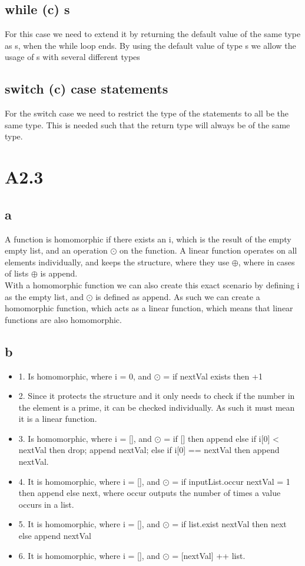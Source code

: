 \documentclass[10pt,a4paper]{article}      %
\begin{document}
\subsection*{while (c) s}
For this case we need to extend it by returning the default value of the same type as s, when the while loop ends. By using the default value of type s we allow the usage of s with several different types 



\subsection*{switch (c) {case statements}}
For the switch case we need to restrict the type of the statements to all be the same type. This is needed such that the return type will always be of the same type.

\section*{A2.3}
\subsection*{a}
A function is homomorphic if there exists an i, which is the result of the empty empty list, and an operation $\odot$ on the function. A linear function operates on all elements individually, and keeps the structure, where they use $\oplus$, where in cases of lists $\oplus$ is append. \\
With a homomorphic function we can also create this exact scenario by defining i as the empty list, and $\odot$ is defined as append. As such we can create a homomorphic function, which acts as a linear function, which means that linear functions are also homomorphic.

\subsection*{b}
\begin{itemize}
\item 1. Is homomorphic, where i = 0, and $\odot$ = if nextVal exists then +1
\item 2. Since it protects the structure and it only needs to check if the number in the element is a prime, it can be checked individually. As such it must mean it is a linear function.
\item 3. Is homomorphic, where i = [], and $\odot$ = if [] then append else if i[0] < nextVal then drop; append nextVal; else if i[0] == nextVal then append nextVal.
\item 4. It is homomorphic, where i = [], and $\odot$ = if inputList.occur nextVal = 1 then append else next, where occur outputs the number of times a value occurs in a list.
\item 5. It is homomorphic, where i = [], and $\odot$ = if list.exist nextVal then next else append nextVal
\item 6. It is homomorphic, where i = [], and $\odot$ = [nextVal] ++ list.

\end{itemize}
\end{document}
